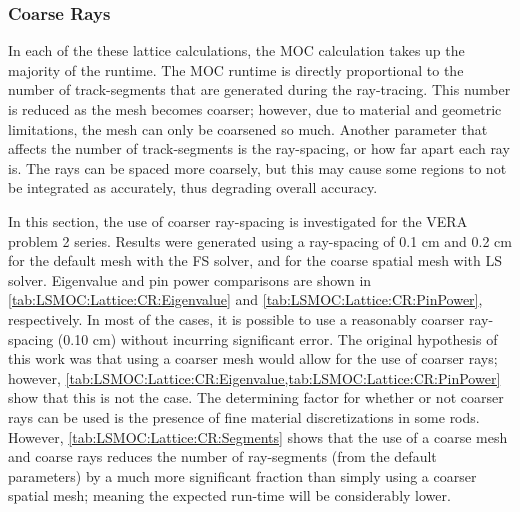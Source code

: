 {{{      \subsubsection{Coarse Rays}{\label{sssec:LSMOC:Coarse Rays}
        In each of the these lattice calculations, the \ac{MOC} calculation takes up the majority of the runtime.
        The \ac{MOC} runtime is directly proportional to the number of track-segments that are generated during the ray-tracing.
        This number is reduced as the mesh becomes coarser; however, due to material and geometric limitations, the mesh can only be coarsened so much.
        Another parameter that affects the number of track-segments is the ray-spacing, or how far apart each ray is.
        The rays can be spaced more coarsely, but this may cause some regions to not be integrated as accurately, thus degrading overall accuracy.

        In this section, the use of coarser ray-spacing is investigated for the \ac{VERA} problem 2 series.
        Results were generated using a ray-spacing of 0.1 cm and 0.2 cm for the default mesh with the \ac{FS} solver, and for the coarse spatial mesh with \ac{LS} solver.
        Eigenvalue and pin power comparisons are shown in \cref{tab:LSMOC:Lattice:CR:Eigenvalue} and \cref{tab:LSMOC:Lattice:CR:PinPower}, respectively.
        In most of the cases, it is possible to use a reasonably coarser ray-spacing (0.10 cm) without incurring significant error.
        The original hypothesis of this work was that using a coarser mesh would allow for the use of coarser rays; however, \cref{tab:LSMOC:Lattice:CR:Eigenvalue,tab:LSMOC:Lattice:CR:PinPower} show that this is not the case.
        The determining factor for whether or not coarser rays can be used is the presence of fine material discretizations in some rods.
        However, \cref{tab:LSMOC:Lattice:CR:Segments} shows that the use of a coarse mesh and coarse rays reduces the number of ray-segments (from the default parameters) by a much more significant fraction than simply using a coarser spatial mesh; meaning the expected run-time will be considerably lower.

}}}}
